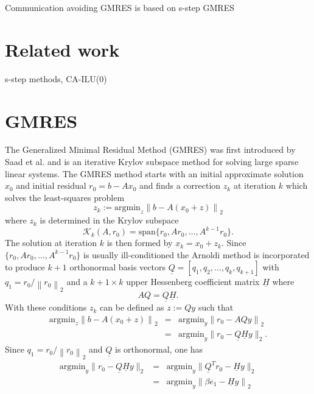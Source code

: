 \documentclass{scrartcl}
\numberwithin{equation}{section}
\newcommand{\norm}[1]{\left\lVert#1\right\rVert}
\begin{document}
Communication avoiding GMRES is based on s-step GMRES 
\cite{Erhel95aparallel}
\\

\pagebreak
\section{Related work}
s-step methods, CA-ILU(0)
\pagebreak

\section{GMRES}
The Generalized Minimal Residual Method (GMRES) was first introduced by Saad et al. \cite{Saad:1986:GGM:14063.14074} and is an iterative Krylov subspace method for solving large sparse linear systems. 
The GMRES method starts with an initial approximate solution $x_0$ and initial residual $r_0 = b - Ax_0$ and finds a correction $z_k$ at iteration $k$ which solves the least-squares problem 
\begin{equation}
	z_k := \text{argmin}_{z} \norm{b - A(x_0 + z)}_2
\end{equation}
where $z_k$ is determined in the Krylov subspace 
\begin{equation*}
	 \mathcal{K}_k(A, r_0) = \text{span}\{r_0, Ar_0, \ldots, A^{k-1}r_0\}.
\end{equation*}
The solution at iteration $k$ is then formed by $x_k = x_0 + z_k$.
Since $\{r_0, Ar_0, \ldots, A^{k-1}r_0\}$ is usually ill-conditioned the Arnoldi method is incorporated to produce $k + 1$ orthonormal basis vectors $\underline{Q} = [q_1, q_2, \ldots, q_k, q_{k + 1}]$ with $q_1 = r_0/\norm{r_0}_2$ and a $k + 1 \times k$ upper Hessenberg coefficient matrix $\underline{H}$ where
\begin{equation*}
	AQ = \underline{Q}\underline{H}.
\end{equation*}
With these conditions $z_k$ can be defined as $z := Qy$ such that 
\begin{eqnarray*}
	\text{argmin}_{z} \norm{b - A(x_0 + z)}_2 &=& \text{argmin}_y \norm{r_0 - AQy}_2 \\
	 &=& \text{argmin}_{y} \lVert r_0 - \underline{Q} \underline{H} y \rVert_2.
\end{eqnarray*}
Since $q_1 = r_0/\norm{r_0}_2$ and $\underline{Q}$ is orthonormal, one has
\begin{eqnarray} \label{eq:stdgmreslsp}
	\text{argmin}_y \lVert r_0 - \underline{Q} \underline{H} y \rVert_2 &=& \text{argmin}_{y} \lVert \underline{Q}^T r_0 - \underline{H} y \rVert_2 \nonumber \\
	&=& \text{argmin}_{y} \norm{\beta e_1 - \underline{H} y}_2 
\end{eqnarray}
\end{document}
